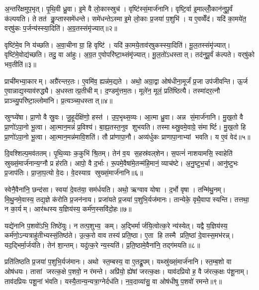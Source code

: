 अ॒न्तरि॑क्षमुप॒भृत्। पृ॒थि॒वी ध्रु॒वा। इ॒मे वै लो॒कास्स्रुच॑। वृष्टि॑स्सं॒मार्ज॑नानि। वृष्टि॒र्वा इ॒माल्लोँ॒कान॑नुपू॒र्वं क॑ल्पयति। ते तत॑ कॢ॒प्तास्समे॑धन्ते। समे॑धन्तेऽस्मा इ॒मे लो॒काः प्र॒जया॑ प॒शुभि॑। य ए॒वव्वेँद॑। यदि॑ का॒मये॑त॒ वर्‌षु॑कः प॒र्जन्य॑स्स्या॒दिति॑। अ॒ग्र॒तस्संमृ॑ज्यात्॥२॥

वृष्टि॑मे॒व नि य॑च्छति। अ॒वा॒चीनाग्रा॒ हि वृष्टि॑। यदि॑ का॒मये॒ताव॑र्‌षुकस्स्या॒दिति॑। मू॒ल॒तस्संमृ॑ज्यात्। वृष्टि॑मे॒वोद्य॑च्छति। तदु॒ वा आ॑हुः। अ॒ग्र॒त ए॒वोपरि॑ष्टा॒थ्संमृ॑ज्यात्। मू॒ल॒तो॑ऽधस्तात्। तद॑नुपू॒र्वं क॑ल्पते। वर्‌षु॑को भव॒तीति॑॥३॥

प्राची॑मभ्या॒कारम्। अग्रै॑रन्तर॒तः। ए॒वमि॑व॒ ह्यन्न॑म॒द्यते। अथो॒ अग्रा॒द्वा ओष॑धीना॒मूर्जं॑ प्र॒जा उप॑जीवन्ति। ऊ॒र्ज ए॒वान्नाद्य॒स्याव॑रुद्ध्यै। अ॒धस्तात्प्र॒तीचीम्। द॒ण्डमु॑त्तम॒तः। मूले॑न॒ मूलं॒ प्रति॑ष्ठित्यै। तस्मा॑दर॒त्नौ प्राञ्च्यु॒परि॑ष्टा॒ल्लोमा॑नि। प्र॒त्यञ्च्य॒धस्तात्॥४॥

स्रुग्घ्ये॑षा। प्रा॒णो वै स्रु॒वः। जु॒हूर्दक्षि॑णो॒ हस्त॑। उ॒प॒भृथ्स॒व्यः। आ॒त्मा ध्रु॒वा। अन्न सं॒मार्ज॑नानि। मु॒ख॒तो वै प्रा॒णो॑ऽपा॒नो भू॒त्वा। आ॒त्मान॒मन्नं॑ प्र॒विश्य॑। बा॒ह्य॒तस्त॒नुव शुभयति। तस्माथ्स्रु॒वमे॒वाग्रे॒ संमार्ष्टि। मु॒ख॒तो हि प्रा॒णो॑ऽपा॒नो भू॒त्वा। आ॒त्मान॒मन्न॑मावि॒शति॑। तौ प्रा॑णापा॒नौ। अव्य॑र्धुकः प्राणापा॒नाभ्यां भवति। य ए॒वं वेद॑॥५॥\anuvakamend[जु॒हूर्मृ॑ज्याद्भव॒तीति॑ प्र॒त्यञ्च्य॒धस्तान्मार्ष्टि॒ पञ्च॑ च]

दि॒वश्शिल्प॒मव॑ततम्। पृ॒थि॒व्याः क॒कुभि॑ श्रि॒तम्। तेन॑ व॒य स॒हस्र॑वल्‌शेन। स॒पत्नं॑ नाशयामसि॒ स्वाहेति॑ स्रुख्सं॒मार्ज॑नान्य॒ग्नौ प्र ह॑रति। आपो॒ वै द॒र्भाः। रू॒पमे॒वैषा॑मे॒तन्म॑हि॒मानं॒ व्याच॑ष्टे। अ॒नु॒ष्टुभ॒र्चा। आनु॑ष्टुभः प्र॒जाप॑तिः। प्रा॒जा॒प॒त्यो वे॒दः। वे॒दस्याग्र स्रुख्सं॒मार्ज॑नानि॥६॥

स्वेनै॒वैना॑नि॒ छन्द॑सा। स्वया॑ दे॒वत॑या॒ सम॑र्धयति। अथो॒ ऋग्वाव योषा। द॒र्भो वृषा। तन्मि॑थु॒नम्। मि॒थु॒नमे॒वास्य॒ तद्य॒ज्ञे क॑रोति प्र॒जन॑नाय। प्रजा॑यते प्र॒जया॑ प॒शुभि॒र्यज॑मानः। तान्येके॒ वृथै॒वापास्यन्ति। तत्तथा॒ न का॒र्यम्। आर॑ब्धस्य य॒ज्ञिय॑स्य॒ कर्म॑ण॒स्सवि॑दो॒हः॥७॥

यद्ये॑नानि प॒शवो॑ऽभि॒ तिष्ठे॑युः। न तत्प॒शुभ्य॒ कम्। अ॒द्भिर्मार्जयि॒त्वोत्क॒रे न्य॑स्येत्। यद्वै य॒ज्ञिय॑स्य॒ कर्म॑णो॒ऽन्यत्राहु॑तीभ्यस्सं॒तिष्ठ॑ते। उ॒त्क॒रो वाव तस्य॑ प्रति॒ष्ठा। ए॒ता हि तस्मै प्रति॒ष्ठां दे॒वास्स॒मभ॑रन्न्। यद॒द्भिर्मा॒र्जय॑ति। तेन॑ शा॒न्तम्। यदु॑त्क॒रे न्य॒स्यति॑। प्र॒ति॒ष्ठामे॒वैना॑नि॒ तद्ग॑मयति॥८॥

प्रति॑तिष्ठति प्र॒जया॑ प॒शुभि॒र्यज॑मानः। अथो स्त॒म्बस्य॒ वा ए॒तद्रू॒पम्। यथ्स्रु॑ख्सं॒मार्ज॑नानि। स्त॒म्ब॒शो वा ओष॑धयः। तासां जरत्क॒क्षे प॒शवो॒ न र॑मन्ते। अप्रि॑यो॒ ह्ये॑षां जरत्क॒क्षः। याव॑दप्रियो ह॒ वै ज॑रत्क॒क्षः प॑शू॒नाम्। ताव॑दप्रियः पशू॒नां भ॑वति। यस्यै॒तान्य॒न्यत्रा॒ग्नेर्दध॑ति। न॒व॒दाव्या॑सु॒ वा ओष॑धीषु प॒शवो॑ रमन्ते॥९॥

